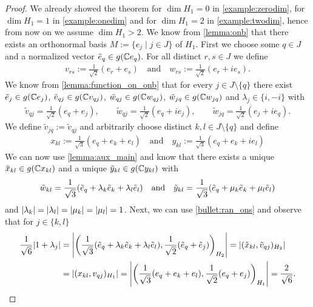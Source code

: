 \begin{proof}
	We already showed the theorem for $\dim H_1 = 0$ in \ref{example:zerodim}, for $\dim H_1 = 1$ in \ref{example:onedim} and for $\dim H_1 = 2$ in \ref{example:twodim}, hence from now on we assume $\dim H_1 > 2$. We know from \ref{lemma:onb} that there exists an orthonormal basis $M := \{e_j \mid j \in J\}$ of $H_1$. First we choose some $q \in J$ and a normalized vector $\tilde{e}_q \in g(\mathbb{C} e_q)$. For all distinct $r,s \in J$ we define
	\begin{align*}
		v_{rs} := \frac{1}{\sqrt{2}}(e_r + e_s) \quad \text{and} \quad w_{rs} := \frac{1}{\sqrt{2}}(e_r + ie_s).
	\end{align*}
	We know from \ref{lemma:function_on_onb} that for every $j \in J \setminus \{q\}$ there exist $\tilde{e}_j \in g(\mathbb{C} e_j)$, $\tilde{v}_{qj} \in g(\mathbb{C} v_{qj})$, $\tilde{w}_{qj} \in g(\mathbb{C} w_{qj})$, $\tilde{w}_{jq} \in g(\mathbb{C} w_{jq})$ and $\lambda_j \in \{i, -i\}$ with
	\begin{align*}
		\tilde{v}_{qj} = \frac{1}{\sqrt{2}}(e_q + e_j), \qquad \tilde{w}_{qj} = \frac{1}{\sqrt{2}}(e_q + ie_j), \qquad \tilde{w}_{jq} = \frac{1}{\sqrt{2}}(e_j + ie_q).
	\end{align*} 
	We define $\tilde{v}_{jq} := \tilde{v}_{qj}$ and arbitrarily choose distinct $k,l \in J \setminus \{q\}$ and define
	\begin{align*}
		x_{kl} := \frac{1}{\sqrt{3}}(e_q + e_k + e_l) \quad \text{and} \quad y_{kl}:= \frac{1}{\sqrt{3}}(e_q + e_k + ie_l)
	\end{align*} 
	We can now use \ref{lemma:aux_main} and know that there exists a unique $\tilde{x}_{kl} \in g(\mathbb{C} x_{kl})$ and a unique $\tilde{y}_{kl} \in g(\mathbb{C} y_{kl})$ with 
	\begin{align*}
		\tilde{w}_{kl} = \frac{1}{\sqrt{3}} {\left ( \tilde{e}_q + \lambda_{k} \tilde{e}_k + \lambda_{l} \tilde{e}_l \right )} \quad \text{and} \quad \tilde{y}_{kl} = \frac{1}{\sqrt{3}}(\tilde{e}_q + \mu_k \tilde{e}_k + \mu_l \tilde{e}_l)
	\end{align*}
	and $|\lambda_k| = |\lambda_l| = {\left | \mu_k \right |} = {\left | \mu_l \right |} = 1$. Next, we can use \ref{bullet:ran_ons} and observe that for $j \in \{k,l\}$
	\begin{align*}
		\frac{1}{\sqrt{6}} \vbraces{1 + \lambda_j} &= \vbraces{\pbraces{\frac{1}{\sqrt{3}} \pbraces{\tilde{e}_q + \lambda_k \tilde{e}_k + \lambda_l \tilde{e}_l}, \frac{1}{\sqrt{2}} \pbraces{\tilde{e}_q + \tilde{e}_j}}_{H_2}} = |(\tilde{x}_{kl}, \tilde{v}_{qj})_{H_2}| \\
		&= |(x_{kl}, v_{qj})_{H_1}| = \vbraces{\pbraces{\frac{1}{\sqrt{3}} \pbraces{e_q + e_k + e_l}, \frac{1}{\sqrt{2}} (e_q + e_j)}_{H_1}} = \frac{2}{\sqrt{6}}.

\end{align*}
\end{proof}
